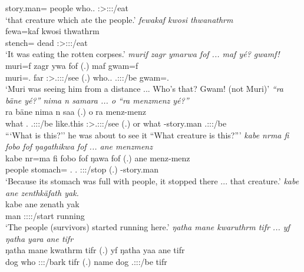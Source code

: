 \begin{exe}
	\Dem{} story.man=\Only{} \Emph{} people who.\Erg.\Sg{} \Sg:\Sbj>\Stpl:\Obj:\Pst:\Ipfv/eat \Emph{}\\
	\trans `that creature which ate the people.'
	\emph{fewakaf kwosi thwanathrm}\\
	\gll fewa=kaf kwosi thwathrm\\ 
	stench=\Prop{} dead \Sg:\Sbj>\Stpl:\Obj:\Pst:\Dur/eat\\
	\trans `It was eating the rotten corpses.'
	\emph{murif zagr ymarwa fof ... maf yé? gwamf!}\\
	\gll muri=f zagr ywa fof (.) maf  gwam=f\\ 
	muri=\Erg.\Sg{} far \Sg:\Sbj>\Tsg.\Masc:\Obj:\Pst:\Ipfv/see \Emph{} (.) who.\Erg.\Sg{} \Tsg.\Masc:\Sbj:\Nonpast:\Ipfv/be gwam=\Erg.\Sg\\
	\trans `Muri was seeing him from a distance ... Who's that? Gwam! (not Muri)'
	\emph{``ra bäne yé?'' nima n samara ... o ``ra menzmenz yé?''}\\
	\gll ra bäne  nima n saa (.) o ra menz-menz \\ 
	what \Dem.\Med{} \Tsg.\Masc:\Sbj:\Nonpast:\Ipfv/be like.this \Imn{} \Sg:\Sbj>\Tsg.\Masc:\Obj:\Pst:\Pfv/see (.) or what \Redup-story.man \Tsg.\Masc:\Sbj:\Nonpast:\Ipfv/be\\
	\trans ```What is this?'' he was about to see it ``What creature is this?'''
	\emph{kabe nrma fi fobo fof ŋagathikwa fof ... ane menzmenz}\\
	\gll kabe nr=ma fi fobo fof ŋawa fof (.) ane menz-menz\\ 
	people stomach=\Char{} \Third.\Abs{} \Dist.\All{} \Emph{} \Sg:\Sbj:\Pst:\Ipfv/stop \Emph{} (.) \Dem{} \Redup-story.man\\
	\trans `Because its stomach was full with people, it stopped there ... that creature.'
	\emph{kabe ane zenthkäfath yak.}\\
	\gll kabe ane zenath yak\\ 
	man \Dem{} \Stpl:\Sbj:\Pst:\Ipfv:\Venit/start running\\
	\trans `The people (survivors) started running here.'
	\emph{ŋatha mane kwaruthrm tifr ... yf ŋatha yara ane tifr}\\
	\gll ŋatha mane kwathrm tifr (.) yf ŋatha yaa ane tifr\\ 
	dog who \Sg:\Sbj:\Pst:\Dur/bark tifr (.) name dog \Tsg.\Masc:\Sbj:\Pst:\Ipfv/be \Dem{} tifr\\

\end{exe}
